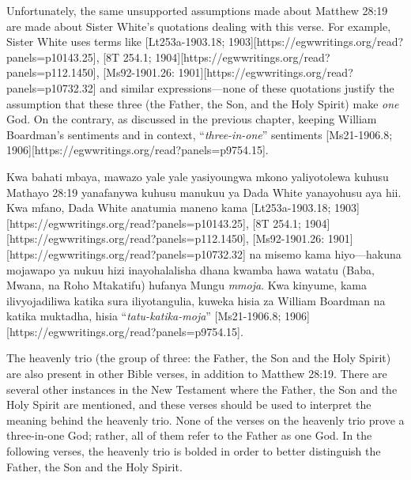 Unfortunately, the same unsupported assumptions made about Matthew 28:19 are made about Sister White’s quotations dealing with this verse. For example, Sister White uses terms like [Lt253a-1903.18; 1903][https://egwwritings.org/read?panels=p10143.25], [8T 254.1; 1904][https://egwwritings.org/read?panels=p112.1450], [Ms92-1901.26: 1901][https://egwwritings.org/read?panels=p10732.32] and similar expressions—none of these quotations justify the assumption that these three (the Father, the Son, and the Holy Spirit) make \textit{one} God. On the contrary, as discussed in the previous chapter, keeping William Boardman’s sentiments and  in context, “\textit{three-in-one}” sentiments [Ms21-1906.8; 1906][https://egwwritings.org/read?panels=p9754.15].


Kwa bahati mbaya, mawazo yale yale yasiyoungwa mkono yaliyotolewa kuhusu Mathayo 28:19 yanafanywa kuhusu manukuu ya Dada White yanayohusu aya hii. Kwa mfano, Dada White anatumia maneno kama [Lt253a-1903.18; 1903][https://egwwritings.org/read?panels=p10143.25], [8T 254.1; 1904][https://egwwritings.org/read?panels=p112.1450], [Ms92-1901.26: 1901][https://egwwritings.org/read?panels=p10732.32] na misemo kama hiyo—hakuna mojawapo ya nukuu hizi inayohalalisha dhana kwamba hawa watatu (Baba, Mwana, na Roho Mtakatifu) hufanya Mungu \textit{mmoja}. Kwa kinyume, kama ilivyojadiliwa katika sura iliyotangulia, kuweka hisia za William Boardman na  katika muktadha, hisia “\textit{tatu-katika-moja}” [Ms21-1906.8; 1906][https://egwwritings.org/read?panels=p9754.15].


The heavenly trio (the group of three: the Father, the Son and the Holy Spirit) are also present in other Bible verses, in addition to Matthew 28:19. There are several other instances in the New Testament where the Father, the Son and the Holy Spirit are mentioned, and these verses should be used to interpret the meaning behind the heavenly trio. None of the verses on the heavenly trio prove a three-in-one God; rather, all of them refer to the Father as one God. In the following verses, the heavenly trio is bolded in order to better distinguish the Father, the Son and the Holy Spirit.


